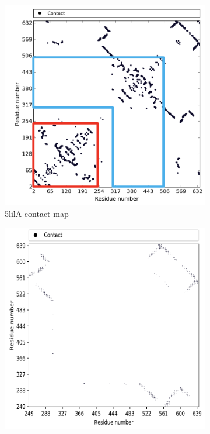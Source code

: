 \begin{figure}[htb]
    \centering %
\begin{subfigure}{0.25\textwidth}
  \includegraphics[width=\linewidth]{Results/5lil_1.png}
  \caption{5lilA contact map}
  \label{fig:0}
\end{subfigure}\hfil %
\begin{subfigure}{0.25\textwidth}
  \includegraphics[width=\linewidth]{Results/5lil_2.png}

\end{subfigure}
\end{figure}

